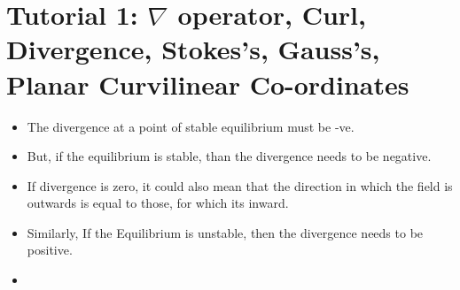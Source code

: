 \documentclass{article}
\begin{document}
\section{Tutorial 1: $\nabla$ operator, Curl, Divergence, Stokes's, Gauss's, Planar Curvilinear Co-ordinates}
\begin{itemize}
  \item The divergence at a point of stable equilibrium must be -ve.
  \item But, if the equilibrium is stable, than the divergence needs to be negative.
  \item If divergence is zero, it could also mean that the direction in which the field is outwards is equal to those, for which its inward.
  \item Similarly, If the Equilibrium is unstable, then the divergence needs to be positive.
  \item
\end{itemize}
\end{document}
